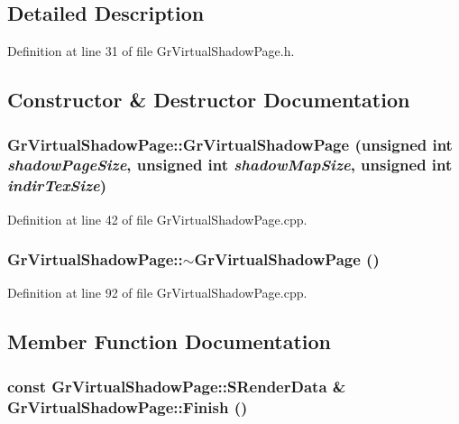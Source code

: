 \subsection{Detailed Description}


Definition at line 31 of file GrVirtualShadowPage.h.

\subsection{Constructor \& Destructor Documentation}
\hypertarget{class_gr_virtual_shadow_page_10dc766d8a8b6c912b39e60893bdfae8}{
\subsubsection[{GrVirtualShadowPage}]{\setlength{\rightskip}{0pt plus 5cm}GrVirtualShadowPage::GrVirtualShadowPage (unsigned int {\em shadowPageSize}, \/  unsigned int {\em shadowMapSize}, \/  unsigned int {\em indirTexSize})}}
\label{class_gr_virtual_shadow_page_10dc766d8a8b6c912b39e60893bdfae8}




Definition at line 42 of file GrVirtualShadowPage.cpp.\hypertarget{class_gr_virtual_shadow_page_6b13a721bc654d712d0159332f668166}{
\subsubsection[{$\sim$GrVirtualShadowPage}]{\setlength{\rightskip}{0pt plus 5cm}GrVirtualShadowPage::$\sim$GrVirtualShadowPage ()}}
\label{class_gr_virtual_shadow_page_6b13a721bc654d712d0159332f668166}




Definition at line 92 of file GrVirtualShadowPage.cpp.

\subsection{Member Function Documentation}
\hypertarget{class_gr_virtual_shadow_page_6fe56d04431ca8c88be756ff92d98e09}{
\subsubsection[{Finish}]{\setlength{\rightskip}{0pt plus 5cm}const {\bf GrVirtualShadowPage::SRenderData} \& GrVirtualShadowPage::Finish ()}}
\label{class_gr_virtual_shadow_page_6fe56d04431ca8c88be756ff92d98e09}




